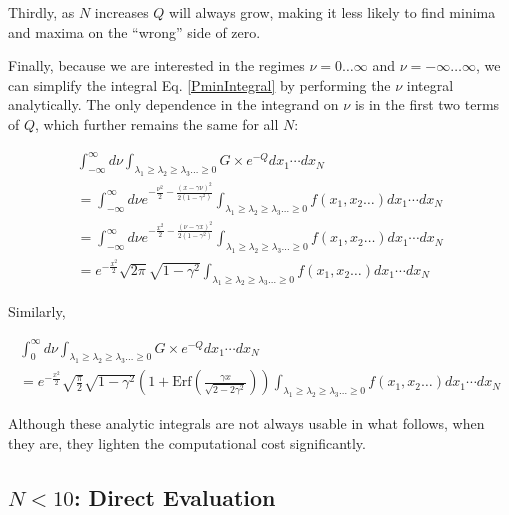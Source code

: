 \documentclass[12pt]{article}
\begin{document}
Thirdly, as $N$ increases $Q$ will always grow, making it less likely to find minima and maxima on the ``wrong'' side of zero.

Finally, because we are interested in the regimes $\nu = 0 \ldots \infty$ and $\nu = -\infty \ldots \infty$, we can simplify the integral Eq. \ref{PminIntegral} by performing the $\nu$ integral analytically. The only dependence in the integrand on $\nu$ is in the first two terms of $Q$, which further remains the same for all $N$:

\begin{equation}
\begin{split}
\int^\infty_{-\infty} d\nu \int_{\lambda_1 \geq \lambda_2 \geq \lambda_3 \ldots \geq 0} G \times e^{-Q} dx_1  \cdots dx_N \\ 
= \int^\infty_{-\infty} d\nu e^{-\frac{\nu^2}{2}- \frac{(x- \gamma \nu)^2}{2(1-\gamma^2)}} \int_{\lambda_1 \geq \lambda_2 \geq \lambda_3 \ldots \geq 0} f(x_1, x_2 \ldots) dx_1  \cdots dx_N \\
= \int^\infty_{-\infty} d\nu e^{-\frac{x^2}{2}- \frac{(\nu - \gamma x)^2}{2(1-\gamma^2)}} \int_{\lambda_1 \geq \lambda_2 \geq \lambda_3 \ldots \geq 0} f(x_1, x_2 \ldots) dx_1  \cdots dx_N \\
= e^{-\frac{x^2}{2}} \sqrt{2\pi}\sqrt{1-\gamma^2}  \int_{\lambda_1 \geq \lambda_2 \geq \lambda_3 \ldots \geq 0} f(x_1, x_2 \ldots) dx_1  \cdots dx_N
\end{split}
\end{equation}

Similarly, 

\begin{equation}
\begin{split}
\int^\infty_0 d\nu \int_{\lambda_1 \geq \lambda_2 \geq \lambda_3 \ldots \geq 0} G \times e^{-Q} dx_1  \cdots dx_N \\ 
= e^{-\frac{x^2}{2}} \sqrt{\frac{\pi}{2}}\sqrt{1-\gamma^2} (1+\mathrm{Erf}(\frac{\gamma x}{\sqrt{2-2\gamma^2}})) \int_{\lambda_1 \geq \lambda_2 \geq \lambda_3 \ldots \geq 0} f(x_1, x_2 \ldots) dx_1  \cdots dx_N
\end{split}
\end{equation}

Although these analytic integrals are not always usable in what follows, when they are, they lighten the computational cost significantly.

\subsection{$N < 10$: Direct Evaluation  }
\end{document}
